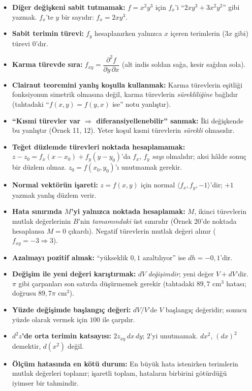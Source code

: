 \begin{dikkat}
\begin{itemize}
  \item \textbf{Diğer değişkeni sabit tutmamak:} $f=x^2y^3$ için $f_x$'i ``$2xy^3+3x^2y^2$'' gibi yazmak. $f_x$'te $y$
        bir sayıdır: $f_x=2xy^3$.
  \item \textbf{Sabit terimin türevi:} $f_y$ hesaplanırken yalnızca $x$ içeren terimlerin ($3x$ gibi) türevi $0$'dır.
  \item \textbf{Karma türevde sıra:} $f_{xy}=\dfrac{\partial^2f}{\partial y\,\partial x}$ (alt indis soldan sağa, kesir
        sağdan sola).
  \item \textbf{Clairaut teoremini yanlış koşulla kullanmak:} Karma türevlerin eşitliği fonksiyonun simetrik olmasına
        değil, karma türevlerin \emph{sürekliliğine} bağlıdır (tahtadaki ``$f(x,y)=f(y,x)$ ise'' notu yanlıştır).
  \item \textbf{``Kısmi türevler var $\Rightarrow$ diferansiyellenebilir'' sanmak:} İki değişkende bu yanlıştır
        (Örnek 11, 12). Yeter koşul kısmi türevlerin \emph{sürekli} olmasıdır.
  \item \textbf{Teğet düzlemde türevleri noktada hesaplamamak:} $z-z_0=f_x(x-x_0)+f_y(y-y_0)$'da $f_x$, $f_y$
        \emph{sayı} olmalıdır; aksi hâlde sonuç bir düzlem olmaz. $z_0=f(x_0,y_0)$'ı unutmamak gerekir.
  \item \textbf{Normal vektörün işareti:} $z=f(x,y)$ için normal $\langle f_x,f_y,-1\rangle$'dir; $+1$ yazmak yanlış düzlem verir.
  \item \textbf{Hata sınırında $M$'yi yalnızca noktada hesaplamak:} $M$, ikinci türevlerin mutlak değerlerinin $B$'nin
        \emph{tamamındaki} üst sınırıdır (Örnek 20'de noktada hesaplansa $M=0$ çıkardı). Negatif türevlerin mutlak değeri
        alınır ($f_{xy}=-3\Rightarrow3$).
  \item \textbf{Azalmayı pozitif almak:} ``yükseklik $0{,}1$ azaltılıyor'' ise $dh=-0{,}1$'dir.
  \item \textbf{Değişim ile yeni değeri karıştırmak:} $dV$ \emph{değişimdir}; yeni değer $V+dV$'dir. $\pi$ gibi çarpanları
        son satırda düşürmemek gerekir (tahtadaki $89{,}7$ cm$^3$ hatası; doğrusu $89{,}7\pi$ cm$^3$).
  \item \textbf{Yüzde değişimde başlangıç değeri:} $dV/V$'de $V$ başlangıç değeridir; sonucu yüzde olarak vermek için
        $100$ ile çarpılır.
  \item \textbf{$d^2z$'de orta terimin katsayısı:} $2z_{xy}\,dx\,dy$; $2$'yi unutmamak. $dx^2$, $(dx)^2$ demektir,
        $d(x^2)$ değil.
  \item \textbf{Ölçüm hatasında en kötü durum:} En büyük hata istenirken terimlerin mutlak değerleri toplanır;
        işaretli toplam, hataların birbirini götürdüğü iyimser bir tahmindir.
\end{itemize}
\end{dikkat}

